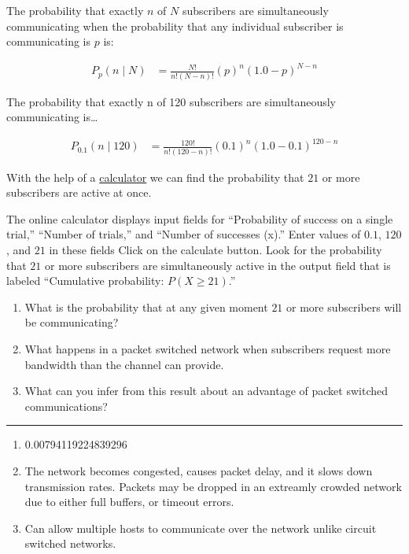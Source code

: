 \documentclass[twoside]{article}
\newenvironment{answer}
  {\vspace*{0.2cm} \rule{12cm}{0.04cm} \vspace*{0.2cm}}
  {\vspace*{0.2cm}}
\begin{document}
\begin{enumerate}
    The probability that exactly $n$ of $N$ subscribers are simultaneously communicating
    when the probability that any individual subscriber is communicating is $p$ is:

    \begin{align*}
      P_{p} (n \mid N ) & = \frac{N!}{n! (N - n)!} (p)^n (1.0 - p)^{N - n}
      \end{align*}

    The probability that exactly n of 120 subscribers are simultaneously communicating
    is\ldots

    \begin{align*}
      P_{0.1} (n \mid 120 ) & = \frac{120!}{n! (120 - n)!} (0.1)^n (1.0 - 0.1)^{120 - n}
      \end{align*}

    With the help of a \href{http://stattrek.com/online-calculator/binomial.aspx}{calculator}
    we can find the probability that $21$ or more
    subscribers are active at once.
  
    The online calculator displays input fields for ``Probability of success on a single trial,''
    ``Number of trials,'' and ``Number of successes (x).''
    Enter values of $0.1$, $120$, and $21$ in these fields
    Click on the calculate button.
    Look for the probability that $21$ or more subscribers are simultaneously active
    in the output field that is labeled ``Cumulative probability: $P(X \ge 21)$.''

    \begin{enumerate}
      \item What is the probability that at any given moment
        $21$ or more subscribers will be communicating?
      \item What happens in a packet switched network when subscribers
        request more bandwidth than the channel can provide.
      \item What can you infer from this result about an advantage
        of packet switched communications?
      \end{enumerate}

  \begin{answer}

  \begin{enumerate}
    \item 0.00794119224839296
    \item The network becomes congested, causes packet delay, and it slows down transmission rates. Packets may be dropped in an extreamly crowded network due to either full buffers, or timeout errors. 
    \item Can allow multiple hosts to communicate over the network unlike circuit switched networks.
    \end{enumerate}


\end{answer}
\end{enumerate}
\end{document}

